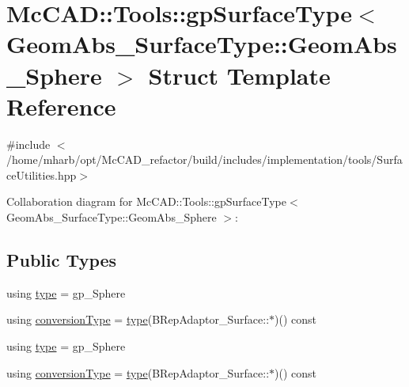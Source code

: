 \hypertarget{structMcCAD_1_1Tools_1_1gpSurfaceType_3_01GeomAbs__SurfaceType_1_1GeomAbs__Sphere_01_4}{}\section{Mc\+C\+AD\+:\+:Tools\+:\+:gp\+Surface\+Type$<$ Geom\+Abs\+\_\+\+Surface\+Type\+:\+:Geom\+Abs\+\_\+\+Sphere $>$ Struct Template Reference}
\label{structMcCAD_1_1Tools_1_1gpSurfaceType_3_01GeomAbs__SurfaceType_1_1GeomAbs__Sphere_01_4}


{\ttfamily \#include $<$/home/mharb/opt/\+Mc\+C\+A\+D\+\_\+refactor/build/includes/implementation/tools/\+Surface\+Utilities.\+hpp$>$}



Collaboration diagram for Mc\+C\+AD\+:\+:Tools\+:\+:gp\+Surface\+Type$<$ Geom\+Abs\+\_\+\+Surface\+Type\+:\+:Geom\+Abs\+\_\+\+Sphere $>$\+:
\subsection*{Public Types}
\begin{DoxyCompactItemize}
\item 
using \hyperlink{structMcCAD_1_1Tools_1_1gpSurfaceType_3_01GeomAbs__SurfaceType_1_1GeomAbs__Sphere_01_4_aba535c4821b1722f8b9cf952ffeb976e}{type} = gp\+\_\+\+Sphere
\item 
using \hyperlink{structMcCAD_1_1Tools_1_1gpSurfaceType_3_01GeomAbs__SurfaceType_1_1GeomAbs__Sphere_01_4_a4a908dc9b85bfc9f6ec822daf9608b5e}{conversion\+Type} = \hyperlink{structMcCAD_1_1Tools_1_1gpSurfaceType_3_01GeomAbs__SurfaceType_1_1GeomAbs__Sphere_01_4_aba535c4821b1722f8b9cf952ffeb976e}{type}(B\+Rep\+Adaptor\+\_\+\+Surface\+::$\ast$)() const
\item 
using \hyperlink{structMcCAD_1_1Tools_1_1gpSurfaceType_3_01GeomAbs__SurfaceType_1_1GeomAbs__Sphere_01_4_aba535c4821b1722f8b9cf952ffeb976e}{type} = gp\+\_\+\+Sphere
\item 
using \hyperlink{structMcCAD_1_1Tools_1_1gpSurfaceType_3_01GeomAbs__SurfaceType_1_1GeomAbs__Sphere_01_4_a4a908dc9b85bfc9f6ec822daf9608b5e}{conversion\+Type} = \hyperlink{structMcCAD_1_1Tools_1_1gpSurfaceType_3_01GeomAbs__SurfaceType_1_1GeomAbs__Sphere_01_4_aba535c4821b1722f8b9cf952ffeb976e}{type}(B\+Rep\+Adaptor\+\_\+\+Surface\+::$\ast$)() const
\end{DoxyCompactItemize}

